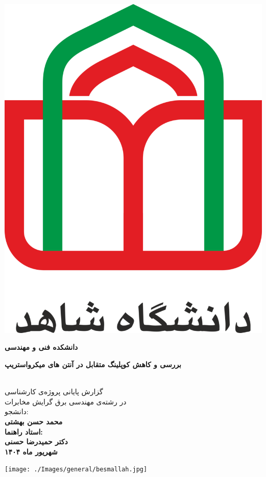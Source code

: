 
\thispagestyle{empty}
\vspace*{-28mm}
\centerline{\includegraphics[scale=0.1]{./Images/general/logo.png}}
\begin{center}
\vspace{-1mm}
\textbf{دانشکده فنی و مهندسی}
\\[3cm]
\begin{Huge}
\textbf{
بررسی و کاهش کوپلینگ متقابل در آنتن های میکرواستریپ
}
\end{Huge}
\\[1.5cm]
\Large
گزارش پایانی پروژه‌ی کارشناسی
\\[0.25cm]
در رشته‌ی مهندسی برق گرایش مخابرات
\\[3cm]
دانشجو:
\\[0.25cm]
\textbf{
محمد حسن بهشتی    
\\[1cm]
استاد راهنما:
\\[0.25cm]
دکتر حمیدرضا حسنی
\\[1cm]
شهریور ماه ۱۴۰۴
}
\end{center}
\newpage
\thispagestyle{empty}
\centerline{\texttt{[image: ./Images/general/besmallah.jpg]}}